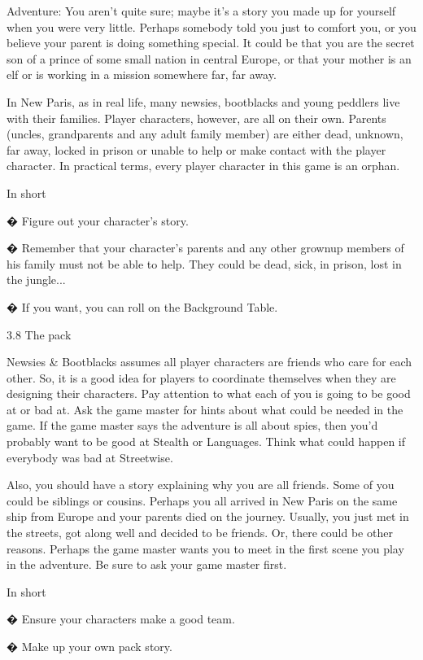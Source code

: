 Adventure: You aren't quite sure; maybe it's a story you made up for yourself when you were very little. Perhaps somebody told you just to comfort you, or you believe your parent is doing something special. It could be that you are the secret son of a prince of some small nation in central Europe, or that your mother is an elf or is working in a mission somewhere far, far away.


In New Paris, as in real life, many newsies, bootblacks and young peddlers live with their families. Player characters, however, are all on their own. Parents (uncles, grandparents and any adult family member) are either dead, unknown, far away, locked in prison or unable to help or make contact with the player character. In practical terms, every player character in this game is an orphan.


In short


� Figure out your character's story.


� Remember that your character's parents and any other grownup members of his family must not be able to help. They could be dead, sick, in prison, lost in the jungle...


� If you want, you can roll on the Background Table.


3.8 The pack


Newsies & Bootblacks assumes all player characters are friends who care for each other. So, it is a good idea for players to coordinate themselves when they are designing their characters. Pay attention to what each of you is going to be good at or bad at. Ask the game master for hints about what could be needed in the game. If the game master says the adventure is all about spies, then you'd probably want to be good at Stealth or Languages. Think what could happen if everybody was bad at Streetwise.


Also, you should have a story explaining why you are all friends. Some of you could be siblings or cousins. Perhaps you all arrived in New Paris on the same ship from Europe and your parents died on the journey. Usually, you just met in the streets, got along well and decided to be friends. Or, there could be other reasons. Perhaps the game master wants you to meet in the first scene you play in the adventure. Be sure to ask your game master first.


In short


� Ensure your characters make a good team.


� Make up your own pack story.


